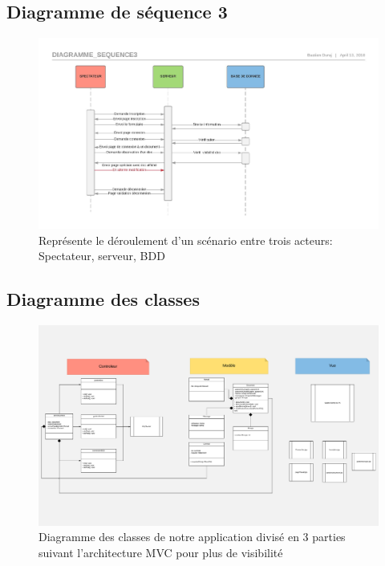 \documentclass[11pt,a4paper]{article}
\begin{document}
\subsection{Diagramme de séquence 3}
\begin{figure}[!h]
\centering
\includegraphics[scale=0.7]{Image/Diagramme_sequence3.pdf}
\caption{Représente le déroulement d'un scénario entre trois acteurs: Spectateur, serveur, BDD}
\end{figure}
\subsection{Diagramme des classes}
\newpage
\begin{figure}[!h]
\includegraphics[angle=270, scale=0.4]{Image/Class_Diagram_dev2.pdf}
\caption{Diagramme des classes de notre application divisé en 3 parties suivant l'architecture MVC pour plus de visibilité}
\end{figure}
\end{document}
